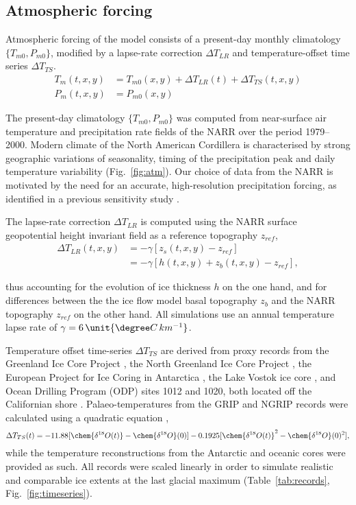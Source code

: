 \documentclass[tc, manuscript]{copernicus}
\begin{document}
\subsection{Atmospheric forcing}

Atmospheric forcing of the model consists of a present-day monthly climatology
$\{T_{m0}, P_{m0}\}$, modified by a lapse-rate correction ${\Delta}T_{LR}$ and
temperature-offset time series ${\Delta}T_{TS}$.
\begin{align}
    T_m(t, x, y) &= T_{m0}(x, y) + {\Delta}T_{LR}(t) + {\Delta}T_{TS}(t, x, y) \\
    P_m(t, x, y) &= P_{m0}(x, y)
\end{align}

The present-day climatology $\{T_{m0}, P_{m0}\}$ was computed from
near-surface air temperature and precipitation rate fields of the NARR
\citep{Mesinger.etal.2006} over the period 1979--2000. Modern climate of the
North American Cordillera is characterised by strong geographic variations of
seasonality, timing of the precipitation peak and daily temperature variability
(Fig.~\ref{fig:atm}).
Our choice of data from the NARR is motivated by the need for an accurate,
high-resolution precipitation forcing, as identified in a previous sensitivity
study \citep{Seguinot.etal.2013}.

The lapse-rate correction ${\Delta}T_{LR}$ is computed using the NARR surface
geopotential height invariant field as a reference topography $z_{ref}$,
\begin{align}
    {\Delta}T_{LR}(t, x, y) &= -\gamma [z_{s}(t, x, y)-z_{ref}] \\
                            &= -\gamma [h(t, x, y)+z_{b}(t, x, y)-z_{ref}],
\end{align}

thus accounting for the evolution of ice thickness $h$ on the one hand, and
for differences between the the ice flow model basal topography $z_{b}$ and the
NARR topography $z_{ref}$ on the other hand. All simulations use an annual temperature lapse rate of $\gamma = 6\,\unit{{\degree}C\,km^{-1}}$.

Temperature offset time-series ${\Delta}T_{TS}$ are derived from proxy records from
the Greenland Ice Core Project \citep[GRIP,][]{Dansgaard.etal.1993}, the
North Greenland Ice Core Project \citep[NGRIP,][]{Andersen.etal.2004},
the European Project for Ice Coring in Antarctica \citep[EPICA,][]
{Jouzel.etal.2007}, the Lake Vostok ice core \citep{Petit.etal.1999}, and Ocean
Drilling Program (ODP) sites 1012 and 1020, both located off the Californian
shore \citep{Herbert.etal.2001}. Palaeo-temperatures from the GRIP and NGRIP
records were calculated using a quadratic equation \citep{Johnsen.etal.1995},
\begin{equation}
    {\Delta}T_{TS}(t) = -11.88[\chem{\delta^{18}O(t)}-\chem{\delta^{18}O}(0)]
                        -0.1925[\chem{\delta^{18}O(t)}^2-\chem{\delta^{18}O}(0)^2],
\end{equation}
while the temperature reconstructions from the Antarctic and oceanic cores were
provided as such. All records were scaled linearly in
order to simulate realistic and comparable ice extents at the last
glacial maximum (Table~\ref{tab:records}, Fig.~\ref{fig:timeseries}).
\end{document}
